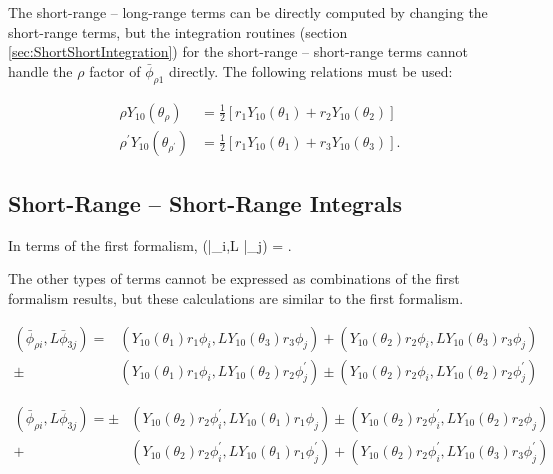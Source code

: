 \documentclass[Dissertation.tex]{subfiles}
\begin{document}
The short-range -- long-range terms can be directly computed by changing the short-range terms, but the integration routines (section \ref{sec:ShortShortIntegration}) for the short-range -- short-range terms cannot handle the $\rho$ factor of $\bar{\phi}_{\rho 1}$ directly. The following relations must be used:

\begin{subequations}
\begin{align}
\rho Y_{10}(\theta_\rho) &= \frac{1}{2}\left[ r_1 Y_{10}(\theta_1) + r_2 Y_{10}(\theta_2) \right] \\
\rho^\prime Y_{10}(\theta_{\rho^\prime}) &= \frac{1}{2}\left[ r_1 Y_{10}(\theta_1) + r_3 Y_{10}(\theta_3) \right].
\end{align}
\end{subequations}



\subsection{Short-Range -- Short-Range Integrals}
\label{sec:PWave2ndShortShort}
In terms of the first formalism,
\beq
\left(\bar{\phi}_{\rho i},L \bar{\phi}_{\rho j}\right) =  .
\eeq

The other types of terms cannot be expressed as combinations of the first formalism results, but these calculations are similar to the first formalism.

\begin{align}
\nonumber \left(\bar{\phi}_{\rho i},L \bar{\phi}_{3j}\right) = &(Y_{10}(\theta_1) r_1 \phi_i, L Y_{10}(\theta_3) r_3 \phi_j) + (Y_{10}(\theta_2) r_2 \phi_i, L Y_{10}(\theta_3) r_3 \phi_j) \\
\pm &(Y_{10}(\theta_1) r_1 \phi_i, L Y_{10}(\theta_2) r_2 \phi_j^\prime) \pm (Y_{10}(\theta_2) r_2 \phi_i, L Y_{10}(\theta_2) r_2 \phi_j^\prime)
\end{align}

\begin{align}
\nonumber \left(\bar{\phi}_{\rho i},L \bar{\phi}_{3j}\right) = \pm &(Y_{10}(\theta_2) r_2 \phi_i^\prime, L Y_{10}(\theta_1) r_1 \phi_j) \pm (Y_{10}(\theta_2) r_2 \phi_i^\prime, L Y_{10}(\theta_2) r_2 \phi_j) \\
+ &(Y_{10}(\theta_2) r_2 \phi_i^\prime, L Y_{10}(\theta_1) r_1 \phi_j^\prime) + (Y_{10}(\theta_2) r_2 \phi_i^\prime, L Y_{10}(\theta_3) r_3 \phi_j^\prime)
\end{align}
\end{document}
